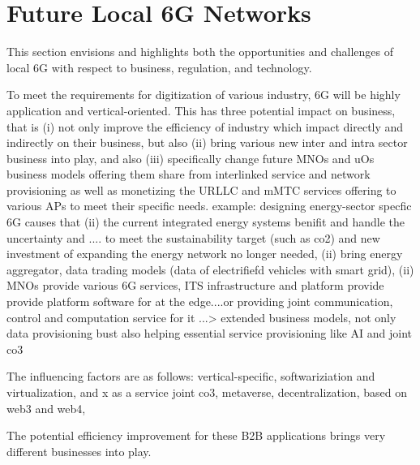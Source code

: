 \documentclass[journal,twocolumn]{IEEEtran}
\begin{document}
\section{Future Local 6G Networks}
This section envisions and highlights both the opportunities and challenges of local 6G with respect to business, regulation, and technology. 

To meet the requirements for digitization of various industry, 6G will be highly application and vertical-oriented. This has three potential impact on business, that is (i) not only improve the efficiency of industry which impact directly and indirectly on their business,   but also (ii) bring various new  inter and intra sector business  into play, and also (iii) specifically change future MNOs and uOs business models offering them share from interlinked service and network provisioning as well as monetizing the URLLC and mMTC services offering to various APs to meet their specific needs. 
example: designing energy-sector specfic 6G causes that (ii) the current integrated energy systems benifit and handle the uncertainty and .... to meet the sustainability target (such as co2) and new investment of expanding the energy network no longer needed,  (ii) bring energy aggregator, data trading models (data of electrifiefd vehicles with smart grid), (ii) MNOs provide various 6G services, ITS infrastructure and platform provide provide platform software for at the edge....or providing joint communication, control and computation service for it ...> extended business models, not only data provisioning bust also helping essential service provisioning like AI and joint co3

The influencing factors are as follows:
vertical-specific,
softwariziation and virtualization, and x as a service
joint co3,
metaverse,
decentralization, based on web3 and web4, 


The potential efficiency improvement for these B2B applications
brings very different businesses into play.

\end{document}
